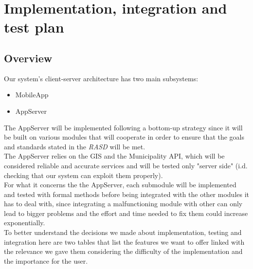 \section{Implementation, integration and test plan}

    \subsection{Overview}

        Our system's client-server architecture has two main subsystems:
        \begin{itemize}           
            \item MobileApp
            \item AppServer
        \end{itemize}
        
        The AppServer will be implemented following a bottom-up strategy since it will be built on various modules that will cooperate in order
        to ensure that the goals and standards stated in the \emph{RASD}\cite{RASD} will be met.\\
        The AppServer relies on the GIS and the Municipality API, which will be considered reliable and accurate services and will be
        tested only "server side" (i.d. checking that our system can exploit them properly).\\
        For what it concerns the the AppServer, each submodule will be implemented and tested with formal methods before being integrated 
        with the other modules it has to deal with, since integrating a malfunctioning module with other can only lead to bigger problems 
        and the effort and time needed to fix them could increase exponentially.\\
        To better understand the decisions we made about implementation, testing and integration here are two tables that list the features
        we want to offer linked with the relevance we gave them considering the difficulty of the implementation and the importance for 
        the user.\\

